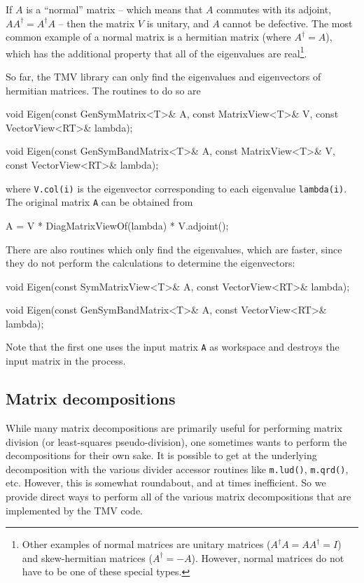\documentclass[twoside,letterpaper,11pt]{article}
\renewcommand{\tt}[1]{{\lstinline {#1}}}
\begin{document}
If $A$ is a ``normal'' matrix -- which means that $A$ commutes with its adjoint,
$AA^\dagger = A^\dagger A$ -- then the 
matrix $V$ is unitary, and $A$ cannot be defective.  
The most common example of a normal matrix is a hermitian matrix
(where $A^\dagger = A$), which has
the additional property that all of the eigenvalues are real\footnote{
Other examples of normal matrices are unitary matrices ($A^\dagger A = AA^\dagger = I$)
and skew-hermitian matrices ($A^\dagger = -A$).  However, normal matrices do
not have to be one of these special types.}.

So far, the TMV library can only find the eigenvalues and eigenvectors 
of hermitian matrices.  The routines to do so are 
\begin{tmvcode}
void Eigen(const GenSymMatrix<T>& A,
      const MatrixView<T>& V, const VectorView<RT>& lambda);

void Eigen(const GenSymBandMatrix<T>& A,
      const MatrixView<T>& V, const VectorView<RT>& lambda);
\end{tmvcode}
where \tt{V.col(i)} is the eigenvector corresponding to each eigenvalue \tt{lambda(i)}.
The original matrix \tt{A} can be obtained from
\begin{tmvcode}
A = V * DiagMatrixViewOf(lambda) * V.adjoint();
\end{tmvcode}

There are also routines which only find the eigenvalues, which are faster, since they
do not perform the calculations to determine the eigenvectors:
\begin{tmvcode}
void Eigen(const SymMatrixView<T>& A, const VectorView<RT>& lambda);

void Eigen(const GenSymBandMatrix<T>& A, const VectorView<RT>& lambda);
\end{tmvcode}
Note that the first one uses the input matrix \tt{A} as workspace and destroys the 
input matrix in the process.

\subsection{Matrix decompositions}
\label{Decompositions}

While many matrix decompositions are primarily useful for performing matrix division
(or least-squares pseudo-division), one sometimes wants to perform the decompositions for 
their own sake.  It is possible to get at the underlying decomposition with the various
divider accessor routines like \tt{m.lud()}, \tt{m.qrd()}, etc.  However, this is somewhat
roundabout, and at times inefficient.  So we provide direct ways to perform all of
the various matrix decompositions that are implemented by the TMV code.
\end{document}
